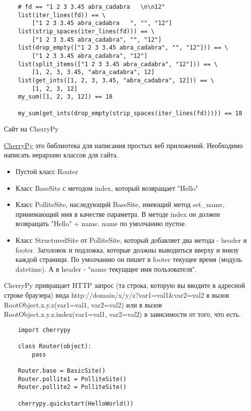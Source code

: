 \documentclass{article}
\begin{document}
\begin{lstlisting}
    # fd == "1 2 3 3.45 abra_cadabra   \n\n12"
    list(iter_lines(fd)) == \
        ["1 2 3 3.45 abra_cadabra   ", "", "12"]
    list(strip_spaces(iter_lines(fd))) == \
        ["1 2 3 3.45 abra_cadabra", "", "12"]
    list(drop_empty(["1 2 3 3.45 abra_cadabra", "", "12"])) == \
        ["1 2 3 3.45 abra_cadabra", "12"]
    list(split_items(["1 2 3 3.45 abra_cadabra", "12"])) == \
        [1, 2, 3, 3.45, "abra_cadabra", 12]
    list(get_ints([1, 2, 3, 3.45, "abra_cadabra", 12])) == \
        [1, 2, 3, 12]
    my_sum([1, 2, 3, 12]) == 18

    my_sum(get_ints(drop_empty(strip_spaces(iter_lines(fd))))) == 18
\end{lstlisting}

\newpage

\begin{center}Сайт на CherryPy\end{center}
\href{http://www.cherrypy.org/}{CherryPy} это библиотека для написания простых веб приложений.
Необходимо написать иерархию классов для сайта. 
\begin{itemize}
    \item Пустой класс Router
    \item Класс BaseSite с методом index, который возвращает "Hello"
    \item Класс PolliteSite, наследующий BaseSite, имеющий метод set\_name,
            принимающий имя в качестве параметра.
            В методе index он должен возвращать "Hello" + name. name по умолчанию пустое.
    \item Класс StructuredSite от PolliteSite, который добавляет два метода - header и footer.
          Заголовок и подложка, которые должны выводиться вверху и внизу каждой страници.
          По умолчанию он пишет в footer текущее время (модуль datetime). А в header - 
          "name {текущщее имя пользователя}".

\end{itemize}

CherryPy привращает HTTP запрос (та строка, которую вы вводите в адресной строке браузера)
вида http://domain/x/y/z?var1=val1\&var2=val2
в вызов RootObject.x.y.z(var1=val1, var2=val2) или в вызов \\
RootObject.x.y.z.index(var1=val1, var2=val2) в зависимости от того, что есть.

\begin{lstlisting}
    import cherrypy

    class Router(object):
        pass

    Router.base = BasicSite()
    Router.pollite1 = PolliteSite()
    Router.pollite2 = PolliteSite()

    cherrypy.quickstart(HelloWorld())
\end{lstlisting}
\end{document}

